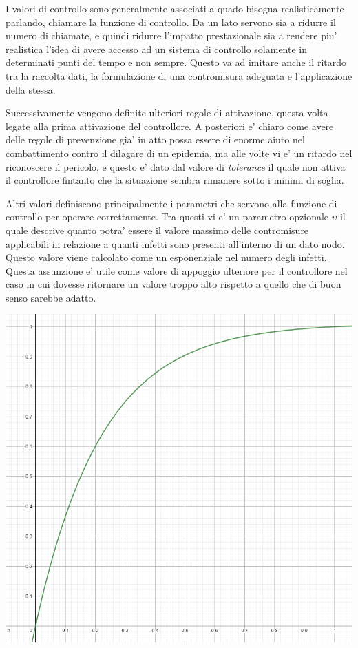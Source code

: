 I valori di controllo sono generalmente associati a quado bisogna realisticamente parlando, chiamare la 
funzione di controllo. Da un lato servono sia a ridurre il numero di chiamate, e quindi ridurre l'impatto 
prestazionale sia a rendere piu' realistica l'idea di avere accesso ad un sistema di controllo solamente 
in determinati punti del tempo e non sempre. Questo va ad imitare anche il ritardo tra la raccolta dati, 
la formulazione di una contromisura adeguata e l'applicazione della stessa.

Successivamente vengono definite ulteriori regole di attivazione, questa volta legate alla prima attivazione
del controllore. A posteriori e' chiaro come avere delle regole di prevenzione gia' in atto possa essere di 
enorme aiuto nel combattimento contro il dilagare di un epidemia, ma alle volte vi e' un ritardo nel riconoscere
il pericolo, e questo e' dato dal valore di \emph{tolerance} il quale non attiva il controllore fintanto che 
la situazione sembra rimanere sotto i minimi di soglia. 

Altri valori definiscono principalmente i parametri che servono alla funzione di controllo per operare correttamente.
Tra questi vi e' un parametro opzionale $\upsilon$ il quale descrive quanto potra' essere il valore massimo delle 
contromisure applicabili in relazione a quanti infetti sono presenti all'interno di un dato nodo. Questo valore viene 
calcolato come un esponenziale nel numero degli infetti. Questa assunzione e' utile come valore di appoggio ulteriore 
per il controllore nel caso in cui dovesse ritornare un valore troppo alto rispetto a quello che di buon senso sarebbe 
adatto. 

\begin{minipage}{\linewidth}
	\centering
	\includegraphics[width=\textwidth]{img/activationfunction_controller.png}
	\label{fig:max_countermeasures_function_abm}
\end{minipage}


